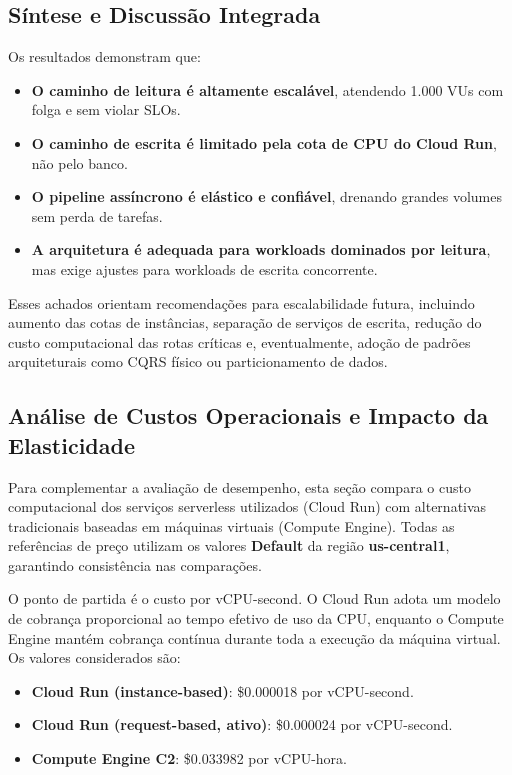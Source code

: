 \subsection{Síntese e Discussão Integrada}

Os resultados demonstram que:

\begin{itemize}
    \item \textbf{O caminho de leitura é altamente escalável}, atendendo 1.000 VUs com folga e sem violar SLOs.
    \item \textbf{O caminho de escrita é limitado pela cota de CPU do Cloud Run}, não pelo banco.
    \item \textbf{O pipeline assíncrono é elástico e confiável}, drenando grandes volumes sem perda de tarefas.
    \item \textbf{A arquitetura é adequada para workloads dominados por leitura}, mas exige ajustes para workloads de escrita concorrente.
\end{itemize}

Esses achados orientam recomendações para escalabilidade futura, incluindo
aumento das cotas de instâncias, separação de serviços de escrita, redução do
custo computacional das rotas críticas e, eventualmente, adoção de padrões
arquiteturais como CQRS físico ou particionamento de dados.

\subsection{Análise de Custos Operacionais e Impacto da Elasticidade}
\label{sec:custos}

Para complementar a avaliação de desempenho, esta seção compara o custo
computacional dos serviços serverless utilizados (Cloud Run) com alternativas
tradicionais baseadas em máquinas virtuais (Compute Engine). Todas as
referências de preço utilizam os valores
\textbf{Default} da região \textbf{us-central1}, garantindo consistência nas comparações.

O ponto de partida é o custo por vCPU-second. O Cloud Run adota um modelo de
cobrança proporcional ao tempo efetivo de uso da CPU, enquanto o Compute Engine
mantém cobrança contínua durante toda a execução da máquina virtual. Os valores
considerados são:

\begin{itemize}
    \item \textbf{Cloud Run (instance-based)}: \$0.000018 por vCPU-second.
    \item \textbf{Cloud Run (request-based, ativo)}: \$0.000024 por vCPU-second.
    \item \textbf{Compute Engine C2}: \$0.033982 por vCPU-hora.
\end{itemize}

